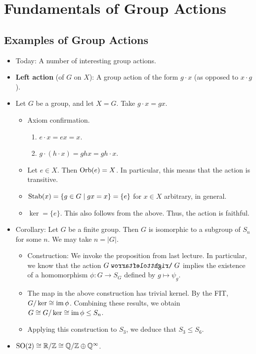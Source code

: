 \documentclass[../notes.tex]{subfiles}
\begin{document}
\chapter{Fundamentals of Group Actions}
\section{Examples of Group Actions}
\begin{itemize}
    \item {}Today: A number of interesting group actions.
    \item \textbf{Left action} (of $G$ on $X$): A group action of the form $g\cdot x$ (as opposed to $x\cdot g$).
    \item Let $G$ be a group, and let $X=G$. Take $g\cdot x=gx$.
    \begin{itemize}
        \item Axiom confirmation.
        \begin{enumerate}
            \item $e\cdot x=ex=x$.
            \item $g\cdot(h\cdot x)=ghx=gh\cdot x$.
        \end{enumerate}
        \item Let $e\in X$. Then $\operatorname{Orb}(e)=X$. In particular, this means that the action is transitive.
        \item $\operatorname{Stab}(x)=\{g\in G\mid gx=x\}=\{e\}$ for $x\in X$ arbitrary, in general.
        \item $\ker=\{e\}$. This also follows from the above. Thus, the action is faithful.
    \end{itemize}
    \item Corollary: Let $G$ be a finite group. Then $G$ is isomorphic to a subgroup of $S_n$ for some $n$. We may take $n=|G|$.
    \begin{itemize}
        \item Construction: We invoke the proposition from last lecture. In particular, we know that the action $G\acts G$ implies the existence of a homomorphism $\phi:G\to S_G$ defined by $g\mapsto\psi_g$.
        \item The map in the above construction has trivial kernel. By the FIT, $G/\ker\cong\operatorname{im}\phi$. Combining these results, we obtain $G\cong G/\ker\cong\operatorname{im}\phi\leq S_n$.
        \item Applying this construction to $S_3$, we deduce that $S_3\leq S_6$.
    \end{itemize}
    \item $\text{SO}(2)\cong\mathbb{R}/\mathbb{Z}\cong\mathbb{Q}/\mathbb{Z}\oplus\mathbb{Q}^\infty$.

\end{itemize}
\end{document}
